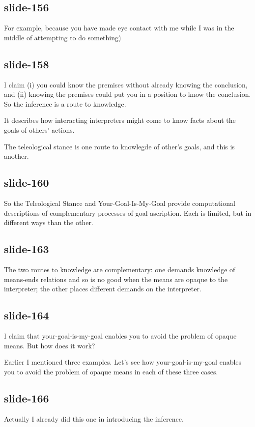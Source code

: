 \documentclass[12pt,\papersize]{extarticle}
\begin{document}
\subsection{slide-156}
For example, because you have made eye contact with me while I was in the middle of attempting to do something)

\subsection{slide-158}
I claim (i) you could know the premises without already knowing the conclusion,
and (ii) knowing the premises could put you in a position to know the conclusion.
So the inference is a route to knowledge.

It describes how interacting interpreters might come to know facts
about the goals of others’ actions.

The teleological stance is one route to knowlegde of other’s goals,
and this is another.

\subsection{slide-160}
So the Teleological Stance and Your-Goal-Is-My-Goal provide
computational descriptions of complementary processes of goal
ascription.  Each is limited, but in different ways than the other.

\subsection{slide-163}
The two routes to knowledge are complementary: one
demands knowledge of means-ends relations and so is no good when the
means are opaque to the interpreter; the other places different demands
on the interpreter.

\subsection{slide-164}
I claim that your-goal-is-my-goal enables you to avoid
the problem of opaque means.  But how does it work?

Earlier I mentioned three examples.
Let’s see how your-goal-is-my-goal enables you to avoid
the problem of opaque means in each of these three cases.

\subsection{slide-166}
Actually I already did this one in introducing the inference.
\end{document}
